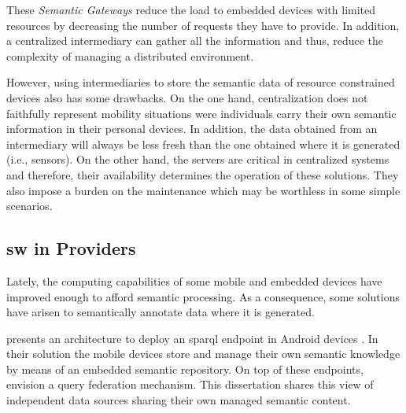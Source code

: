 These \emph{Semantic Gateways} reduce the load to embedded devices with limited resources by decreasing the number of requests they have to provide.
In addition, a centralized intermediary can gather all the information and thus, reduce the complexity of managing a distributed environment.

However, using intermediaries to store the semantic data of resource constrained devices also has some drawbacks.
On the one hand, centralization does not faithfully represent mobility situations were individuals carry their own semantic information in their personal devices.
In addition, the data obtained from an intermediary will always be less fresh than the one obtained where it is generated (i.e., sensors).
On the other hand, the servers are critical in centralized systems and therefore, their availability determines the operation of these solutions.
They also impose a burden on the maintenance which may be worthless in some simple scenarios.



\subsection{\acl{sw} in Providers}
\label{sec:sw_providers}

Lately, the computing capabilities of some mobile and embedded devices have improved enough to afford semantic processing. %
As a consequence, some solutions have arisen to semantically annotate data where it is generated. %


\citet{daquin_enabling_2011} presents an architecture to deploy an \acs{sparql}  endpoint in Android devices .
In their solution the mobile devices store and manage their own semantic knowledge by means of an embedded semantic repository.
On top of these endpoints, \citeauthor{daquin_enabling_2011} envision a query federation mechanism.
This dissertation shares this view of independent data sources sharing their own managed semantic content. %


